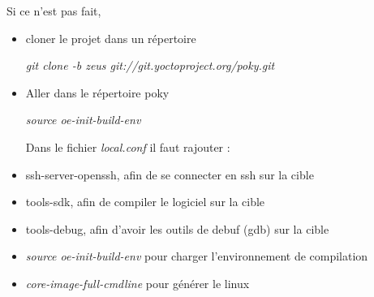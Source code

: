 Si ce n'est pas fait,
\begin{itemize}
\item 
 cloner le projet dans un répertoire


\textit{git clone -b zeus git://git.yoctoproject.org/poky.git}

\item 
Aller dans le répertoire poky

\textit{source oe-init-build-env}

Dans le fichier \textit{local.conf} il faut rajouter : 

\item ssh-server-openssh, afin de se connecter en ssh sur la cible
\item tools-sdk, afin de compiler le logiciel sur la cible
\item tools-debug, afin d'avoir les outils de debuf (gdb) sur la cible



\item 
\textit{source oe-init-build-env} pour charger l'environnement de compilation

\item 
\textit{core-image-full-cmdline} pour générer le linux




\end{itemize}

